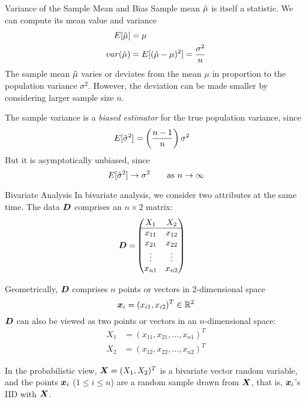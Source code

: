 \begin{frame}{Variance of the Sample Mean and Bias}
Sample mean $\hat{\mu}$ is itself a statistic. We can 
compute its mean value and
variance
\begin{align*}
  E[\hat{\mu}] & = \mu\\
  var(\hat{\mu}) & = E[(\hat{\mu} -\mu)^2] =  {\sigma^2 \over n}
\end{align*}
The sample mean $\hat{\mu}$ varies or deviates from the
 mean $\mu$ in proportion to the population
variance $\sigma^2$. However, the deviation can be made smaller by
considering larger sample size $n$.

\bigskip
The sample variance
is a {\em biased estimator}
for the true population variance, since
\begin{align*}
    E[\hat{\sigma}^2]    & = \left({n-1\over n} \right) \sigma^2
\end{align*}
But it is asymptotically unbiased, since
$$E[\hat{\sigma}^2] \to \sigma^2 \qquad \text{as } n \to \infty$$

\end{frame}

\ifdefined\wox \begin{frame} \titlepage \end{frame} \fi

\begin{frame}{Bivariate Analysis}
In bivariate analysis, we consider two attributes at the same
time. 
The data ${\boldsymbol D}$ comprises an $n \times 2$ matrix:
\begin{align*}
    \bD = &
    \matr{%
        X_1 & X_2\\
        \hline
        x_{11} & x_{12}\\
        x_{21} & x_{22}\\
        \vdots & \vdots\\
        x_{n1} & x_{n2}%
        }
\end{align*}

Geometrically, ${\boldsymbol D}$ comprises
$n$ points or vectors in 2-dimensional space
$${\boldsymbol x}_i = (x_{i1}, x_{i2})^T \in {\mathord{\mathbb R}}^2$$ 
${\boldsymbol D}$ can also be viewed as two points or vectors in an
$n$-dimensional space:
\begin{align*}
X_1 & = (x_{11}, x_{21}, \ldots, x_{n1})^T\\
X_2 & = (x_{12}, x_{22}, \ldots, x_{n2})^T
\end{align*}

\bigskip
In the probabilistic view,
${\boldsymbol X} = (X_1,X_2)^T$ is a bivariate
vector random variable, and the points ${\boldsymbol x}_i$ ($1
\le i \le n$) are a random sample drawn from ${\boldsymbol X}$,
that is, ${\boldsymbol x}_i$'s IID with ${\boldsymbol X}$.
\end{frame}


